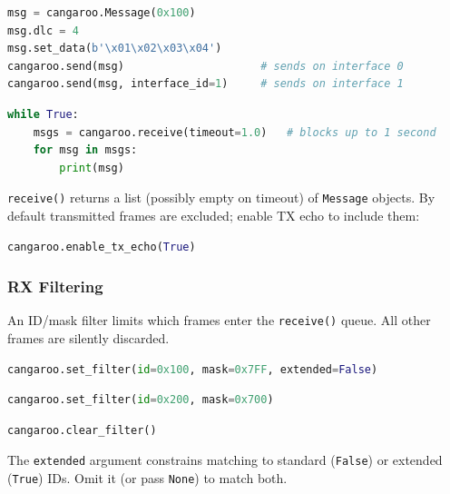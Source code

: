 \documentclass[a4paper,11pt]{article}
\begin{document}
\begin{lstlisting}[language=Python, caption={Send a single frame}]
msg = cangaroo.Message(0x100)
msg.dlc = 4
msg.set_data(b'\x01\x02\x03\x04')
cangaroo.send(msg)                     # sends on interface 0
cangaroo.send(msg, interface_id=1)     # sends on interface 1
\end{lstlisting}

\begin{lstlisting}[language=Python, caption={Blocking receive loop}]
while True:
    msgs = cangaroo.receive(timeout=1.0)   # blocks up to 1 second
    for msg in msgs:
        print(msg)
\end{lstlisting}

\texttt{receive()} returns a list (possibly empty on timeout) of \texttt{Message}
objects. By default transmitted frames are excluded; enable TX echo to include them:

\begin{lstlisting}[language=Python]
cangaroo.enable_tx_echo(True)
\end{lstlisting}

\subsubsection{RX Filtering}

An ID/mask filter limits which frames enter the \texttt{receive()} queue.
All other frames are silently discarded.

\begin{lstlisting}[language=Python, caption={Accept only ID 0x100 (standard frames)}]
cangaroo.set_filter(id=0x100, mask=0x7FF, extended=False)
\end{lstlisting}

\begin{lstlisting}[language=Python, caption={Accept a range of IDs (0x200-0x2FF)}]
cangaroo.set_filter(id=0x200, mask=0x700)
\end{lstlisting}

\begin{lstlisting}[language=Python, caption={Remove the filter (accept all frames)}]
cangaroo.clear_filter()
\end{lstlisting}

The \texttt{extended} argument constrains matching to standard (\texttt{False})
or extended (\texttt{True}) IDs. Omit it (or pass \texttt{None}) to match both.
\end{document}
